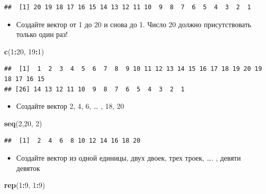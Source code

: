 \documentclass[]{book}
\newenvironment{Shaded}{\begin{snugshade}}{\end{snugshade}}
\newcommand{\KeywordTok}[1]{\textcolor[rgb]{0.13,0.29,0.53}{\textbf{#1}}}
\newcommand{\DecValTok}[1]{\textcolor[rgb]{0.00,0.00,0.81}{#1}}
\newcommand{\OperatorTok}[1]{\textcolor[rgb]{0.81,0.36,0.00}{\textbf{#1}}}
\newcommand{\NormalTok}[1]{#1}
\providecommand{\tightlist}{%
  \setlength{\itemsep}{0pt}\setlength{\parskip}{0pt}}
\begin{document}
\begin{verbatim}
##  [1] 20 19 18 17 16 15 14 13 12 11 10  9  8  7  6  5  4  3  2  1
\end{verbatim}

\begin{itemize}
\tightlist
\item
  Создайте вектор от 1 до 20 и снова до 1. Число 20 должно
  присутствовать только один раз!
\end{itemize}

\begin{Shaded}
\begin{Highlighting}[]
\KeywordTok{c}\NormalTok{(}\DecValTok{1}\OperatorTok{:}\DecValTok{20}\NormalTok{, }\DecValTok{19}\OperatorTok{:}\DecValTok{1}\NormalTok{)}
\end{Highlighting}
\end{Shaded}

\begin{verbatim}
##  [1]  1  2  3  4  5  6  7  8  9 10 11 12 13 14 15 16 17 18 19 20 19 18 17 16 15
## [26] 14 13 12 11 10  9  8  7  6  5  4  3  2  1
\end{verbatim}

\begin{itemize}
\tightlist
\item
  Создайте вектор 2, 4, 6, \ldots{} , 18, 20
\end{itemize}

\begin{Shaded}
\begin{Highlighting}[]
\KeywordTok{seq}\NormalTok{(}\DecValTok{2}\NormalTok{,}\DecValTok{20}\NormalTok{, }\DecValTok{2}\NormalTok{)}
\end{Highlighting}
\end{Shaded}

\begin{verbatim}
##  [1]  2  4  6  8 10 12 14 16 18 20
\end{verbatim}

\begin{itemize}
\tightlist
\item
  Создайте вектор из одной единицы, двух двоек, трех троек, \ldots{}. ,
  девяти девяток
\end{itemize}

\begin{Shaded}
\begin{Highlighting}[]
\KeywordTok{rep}\NormalTok{(}\DecValTok{1}\OperatorTok{:}\DecValTok{9}\NormalTok{, }\DecValTok{1}\OperatorTok{:}\DecValTok{9}\NormalTok{)}
\end{Highlighting}
\end{Shaded}
\end{document}
